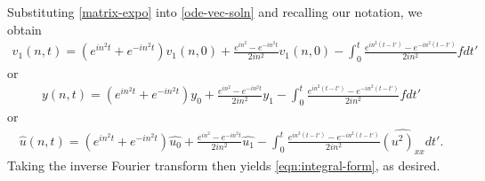\documentclass[12pt,reqno]{amsart}
\numberwithin{equation}{section}  %
\newcommand{\wh}{\widehat}
\begin{document}
\begin{appendices}
%
%
Substituting \eqref{matrix-expo} into \eqref{ode-vec-soln} and recalling our notation, we obtain
%
%
\begin{equation*}
\begin{split}
  v_{1}(n, t) = (e^{in^{2}t} + e^{-in^{2}t})v_{1}(n, 0) + \frac{e^{in^{2}} -
  e^{-in^{2}t}}{2 i n^{2}} v_{1}(n, 0) - \int_{0}^{t} \frac{e^{in^{2}(t - t')} -
  e^{-in^{2}(t-t')}}{2 i n^{2}} f dt'
\end{split}
\end{equation*}
%
%
or
\begin{equation*}
\begin{split}
  y(n, t) = (e^{in^{2}t} + e^{-in^{2}t})y_{0} + \frac{e^{in^{2}} -
  e^{-in^{2}t}}{2 i n^{2}} y_{1} - \int_{0}^{t} \frac{e^{in^{2}(t - t')} -
  e^{-in^{2}(t-t')}}{2 i n^{2}} f dt'
\end{split}
\end{equation*}
or
\begin{equation*}
\begin{split}
  \wh{u}(n, t) = (e^{in^{2}t} + e^{-in^{2}t})\wh{u_0} + \frac{e^{in^{2}} -
  e^{-in^{2}t}}{2 i n^{2}} \wh{u_1} - \int_{0}^{t} \frac{e^{in^{2}(t - t')} -
  e^{-in^{2}(t-t')}}{2 i n^{2}} \wh{(u^{2})_{xx}} dt'.
\end{split}
\end{equation*}
%
Taking the inverse Fourier transform then yields \eqref{eqn:integral-form}, as
desired.

\end{appendices}
\end{document}
